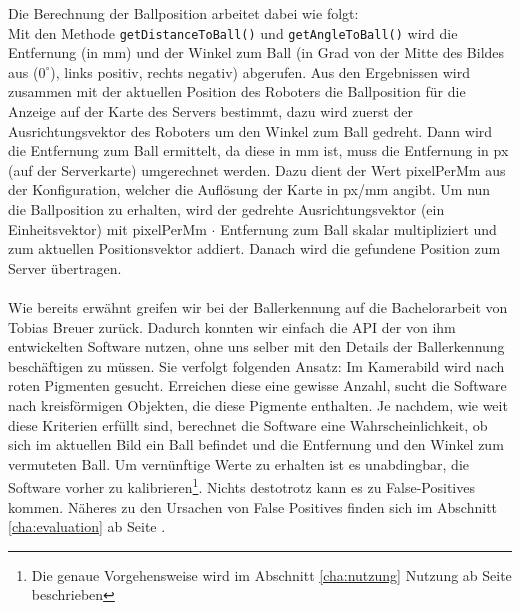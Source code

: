 Die Berechnung der Ballposition arbeitet dabei wie folgt:\\
 Mit den Methode \lstinline|getDistanceToBall()| und
    \lstinline|getAngleToBall()| wird die Entfernung (in mm) und der Winkel
    zum Ball (in Grad von der Mitte des Bildes aus ($0^\circ$), links positiv, rechts
		negativ) abgerufen. 
Aus den Ergebnissen wird zusammen mit der aktuellen Position des Roboters
    die Ballposition für die Anzeige auf der Karte des Servers bestimmt, dazu wird zuerst der Ausrichtungsvektor des
		Roboters um den Winkel zum Ball gedreht.
Dann wird die Entfernung zum Ball ermittelt, da diese in mm ist, muss
die Entfernung in px (auf der Serverkarte) umgerechnet werden. Dazu dient der Wert
pixelPerMm aus der Konfiguration, welcher die Auflösung der Karte in px/mm angibt. Um nun die Ballposition zu
	erhalten, wird der gedrehte Ausrichtungsvektor (ein Einheitsvektor) mit
		pixelPerMm $\cdot$ Entfernung zum Ball skalar multipliziert und zum aktuellen
		Positionsvektor addiert.
Danach wird die gefundene Position zum Server übertragen.
\\\\
Wie bereits erwähnt greifen wir bei der Ballerkennung auf die
Bachelorarbeit von Tobias Breuer zurück. Dadurch konnten wir einfach
die API der von ihm entwickelten Software nutzen, ohne uns selber mit
den Details der Ballerkennung beschäftigen zu müssen. Sie verfolgt
folgenden Ansatz: Im Kamerabild wird nach roten Pigmenten
gesucht. Erreichen diese eine gewisse Anzahl, sucht die Software nach
kreisförmigen Objekten, die diese Pigmente enthalten. Je nachdem,
wie weit diese Kriterien erfüllt sind, berechnet die Software eine
Wahrscheinlichkeit, ob sich im aktuellen Bild ein Ball befindet und
die Entfernung und den Winkel zum vermuteten Ball. Um vernünftige
Werte zu erhalten ist es unabdingbar, die Software vorher zu
kalibrieren\footnote{Die genaue Vorgehensweise wird im Abschnitt
\ref{cha:nutzung} Nutzung ab Seite \pageref{cha:nutzung} beschrieben}.  Nichts
destotrotz kann es zu False-Positives
kommen. Näheres zu den  Ursachen von
False Positives finden sich im Abschnitt \ref{cha:evaluation} ab Seite \pageref{cha:evaluation}.
